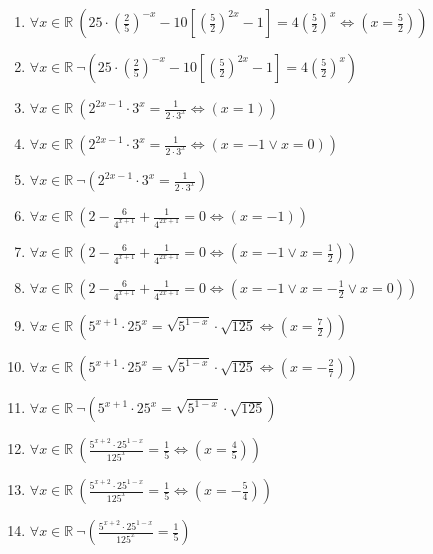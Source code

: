 \documentclass[11pt,a4paper]{article}
\begin{document}
\begin{enumerate}
\item $\displaystyle \forall x \in \mathbb{R}\ \left( 25 \cdot \left(\frac{2}{5}\right)^{-x} - 10\left[\left(\frac{5}{2}\right)^{2x} - 1\right] = 4\left(\frac{5}{2}\right)^{x} \iff \left( x = \frac{5}{2} \right) \right)$
\item $\displaystyle \forall x \in \mathbb{R}\ \lnot \left( 25 \cdot \left(\frac{2}{5}\right)^{-x} - 10\left[\left(\frac{5}{2}\right)^{2x} - 1\right] = 4\left(\frac{5}{2}\right)^{x} \right)$
\item $\displaystyle \forall x \in \mathbb{R}\ \left( 2^{2x-1} \cdot 3^{x} = \frac{1}{2 \cdot 3^{x}} \iff \left( x = 1 \right) \right)$
\item $\displaystyle \forall x \in \mathbb{R}\ \left( 2^{2x-1} \cdot 3^{x} = \frac{1}{2 \cdot 3^{x}} \iff \left( x = -1 \lor x = 0 \right) \right)$
\item $\displaystyle \forall x \in \mathbb{R}\ \lnot \left( 2^{2x-1} \cdot 3^{x} = \frac{1}{2 \cdot 3^{x}} \right)$
\item $\displaystyle \forall x \in \mathbb{R}\ \left( 2 - \frac{6}{4^{x+1}} + \frac{1}{4^{2x+1}} = 0 \iff \left( x = -1 \right) \right)$
\item $\displaystyle \forall x \in \mathbb{R}\ \left( 2 - \frac{6}{4^{x+1}} + \frac{1}{4^{2x+1}} = 0 \iff \left( x = -1 \lor x = \frac{1}{2} \right) \right)$
\item $\displaystyle \forall x \in \mathbb{R}\ \left( 2 - \frac{6}{4^{x+1}} + \frac{1}{4^{2x+1}} = 0 \iff \left( x = -1 \lor x = -\frac{1}{2} \lor x = 0 \right) \right)$
\item $\displaystyle \forall x \in \mathbb{R}\ \left( 5^{x+1} \cdot 25^{x} = \sqrt{5^{1-x}} \cdot \sqrt{125} \iff \left( x = \frac{7}{2} \right) \right)$
\item $\displaystyle \forall x \in \mathbb{R}\ \left( 5^{x+1} \cdot 25^{x} = \sqrt{5^{1-x}} \cdot \sqrt{125} \iff \left( x = -\frac{2}{7} \right) \right)$
\item $\displaystyle \forall x \in \mathbb{R}\ \lnot \left( 5^{x+1} \cdot 25^{x} = \sqrt{5^{1-x}} \cdot \sqrt{125} \right)$
\item $\displaystyle \forall x \in \mathbb{R}\ \left( \frac{5^{x+2} \cdot 25^{1-x}}{125^{x}} = \frac{1}{5} \iff \left( x = \frac{4}{5} \right) \right)$
\item $\displaystyle \forall x \in \mathbb{R}\ \left( \frac{5^{x+2} \cdot 25^{1-x}}{125^{x}} = \frac{1}{5} \iff \left( x = -\frac{5}{4} \right) \right)$
\item $\displaystyle \forall x \in \mathbb{R}\ \lnot \left( \frac{5^{x+2} \cdot 25^{1-x}}{125^{x}} = \frac{1}{5} \right)$

\end{enumerate}
\end{document}
